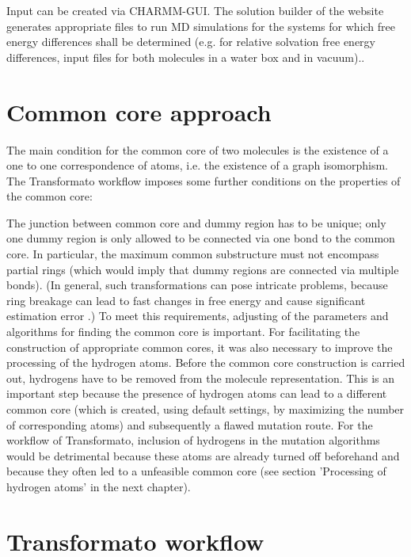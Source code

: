 Input can be created via CHARMM-GUI\cite{Jo.2008}. The solution builder of the website generates appropriate files to run MD simulations for the systems for which free energy differences shall be determined (e.g. for relative solvation free energy differences, input files for both molecules in a water box and in vacuum).\cite{Braunsfeld.}\cite{Karwounopoulos.2022}.

\section{Common core approach}

The main condition for the common core of two molecules is the existence
of a one to one correspondence of atoms, i.e. the existence of a graph
isomorphism. The Transformato workflow imposes some further conditions
on the properties of the common core:

The junction between common core and dummy region has to be unique;
only one dummy region is only allowed to be connected via one bond to the
common core. In particular, the maximum common substructure must not
encompass partial rings (which would imply that dummy regions are
connected via multiple bonds). (In general, such transformations can pose intricate problems, because ring breakage can lead to fast changes in free energy
and cause significant estimation error \cite{Liu.2015}.)
To meet this requirements, adjusting of the parameters and algorithms for finding the common core is important. For facilitating the construction of appropriate common cores, it was also necessary to improve the processing of the hydrogen atoms. Before the common core construction is carried out, hydrogens have to be
removed from the molecule representation. This is an important step
because the presence of hydrogen atoms can lead to a different common
core (which is created, using default settings, by maximizing the
number of corresponding atoms) and subsequently a flawed mutation
route. For the workflow of Transformato, inclusion of hydrogens in
the mutation algorithms would be detrimental because these atoms are
already turned off beforehand and because they often led to a unfeasible common core (see section 'Processing of hydrogen atoms' in the next chapter).


\section{Transformato workflow}


